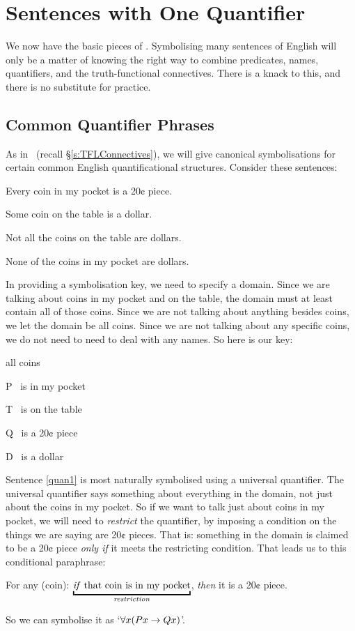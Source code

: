 \chapter{Sentences with One Quantifier}\label{s:MoreMonadic}
We now have the basic pieces of \FOL. Symbolising many sentences of English will only be a matter of knowing the right way to combine predicates, names, quantifiers, and the truth-functional connectives. There is a knack to this, and there is no substitute for practice.


\section{Common Quantifier Phrases}
As in \TFL\ (recall §\ref{s:TFLConnectives}), we will give canonical symbolisations for certain common English quantificational structures.
Consider these sentences:
	\begin{earg}
		\item[\ex{quan1}] Every coin in my pocket is a 20¢ piece.
		\item[\ex{quan2}] Some coin on the table is a dollar.
		\item[\ex{quan3}] Not all the coins on the table are dollars.
		\item[\ex{quan4}] None of the coins in my pocket are dollars.
	\end{earg}
In providing a symbolisation key, we need to specify a domain. Since we are talking about coins in my pocket and on the table, the domain must at least contain all of those coins. Since we are not talking about anything besides coins, we let the domain be all coins. Since we are not talking about any specific coins, we do not need to need to deal with any names. So here is our key:
	\begin{ekey}
		\item[\domain] all coins
		\item[P] \blank\ is in my pocket
		\item[T] \blank\ is on the table
		\item[Q] \blank\ is a 20¢ piece
		\item[D] \blank\ is a dollar
	\end{ekey}
Sentence \ref{quan1} is most naturally symbolised using a universal quantifier. The universal quantifier says something about everything in the domain, not just about the coins in my pocket. So if we want to talk just about coins in my pocket, we will need to \emph{restrict} the quantifier, by imposing a condition on the things we are saying are 20¢ pieces. That is: something in the domain is claimed to be a 20¢ piece \emph{only if} it meets the restricting condition. That leads us to this conditional paraphrase: \begin{earg}
	\item[\ex{coinpa}] For any (coin): $\underbracket{\text{\emph{if} that coin is in my pocket}}_{\text{\emph{restriction}}}$, \emph{then} it is a 20¢ piece.
\end{earg} So we can symbolise it as `$\forall x(Px \rightarrow Qx)$'.

